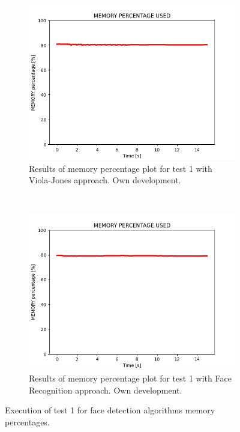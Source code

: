 \documentclass[11pt]{report} %
\begin{document}
\begin{figure}[H]
	\centering
	\begin{subfigure}{.5\textwidth}
		\centering
		\includegraphics[width=1.0\linewidth]{assets/imgs/computer_vision/face_detection_ex_1_hc_memory.png}
		\caption{Results of memory percentage plot for test 1 with Viola-Jones approach. Own development.}
		\label{fig_computer_vision_test_1_memory_a}
	\end{subfigure}~
	\begin{subfigure}{.5\textwidth}
		\centering
		\includegraphics[width=1.0\linewidth]{assets/imgs/computer_vision/face_detection_ex_1_fr_memory.png}
		\caption{Results of memory percentage plot for test 1 with Face Recognition approach. Own development.}
		\label{fig_computer_vision_test_1_memory_b}
	\end{subfigure}%
	\caption{Execution of test 1 for face detection algorithms memory percentages.}
	\label{fig_computer_vision_test_1_memory}
\end{figure}
\end{document}
